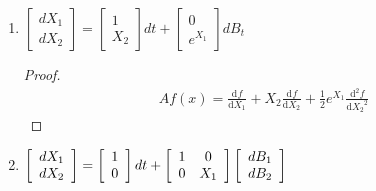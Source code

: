 \documentclass[11pt]{article}
\newcommand{\gs}{\sigma}
\newcommand{\mrm}{\mathrm}
\newcommand{\diff}{\mrm{d}}
\newcommand{\deriv}[3][]{%
  \ensuremath{\frac{\diff^{#1} {#2}}{\diff {#3}^{#1}}}}
\begin{document}
\begin{enumerate}
\begin{proof}
\begin{align*}
\begin{bmatrix}
\end{bmatrix}=
\begin{bmatrix}
1 \\ \mu X_t
\end{bmatrix} dt +
\begin{bmatrix}
0 \\ \gs
\end{bmatrix} dB_t
\end{align*} so letting $x_2=x$ and $x_1=t$:
\begin{align*}
Af(x) &= \deriv{f}{x_1} + \mu x \deriv{f}{x_2} + \frac{1}{2} \gs^2 \deriv[2]{f}{x_2}\\
&= \deriv{f}{t} + \mu x \deriv{f}{x} + \frac{1}{2}\gs^2 \deriv[2]{f}{x}
\end{align*}
\end{proof}
\item $\left[ \begin{array} { c } { d X _ { 1 } } \\ { d X _ { 2 } } \end{array} \right] = \left[ \begin{array} { c } { 1 } \\ { X _ { 2 } } \end{array} \right] d t + \left[ \begin{array} { c } { 0 } \\ { e ^ { X _ { 1 } } } \end{array} \right] d B _ { t }$
\begin{proof}
\begin{align*}
Af(x) = \deriv{f}{X_1}+X_2 \deriv{f}{X_2} + \frac{1}{2}e^{X_1} \deriv[2]{f}{X_2}
\end{align*}
\end{proof}
\item $\left[ \begin{array} { l } { d X _ { 1 } } \\ { d X _ { 2 } } \end{array} \right] = \left[ \begin{array} { l } { 1 } \\ { 0 } \end{array} \right] d t + \left[ \begin{array} { c c } { 1 } & { 0 } \\ { 0 } & { X _ { 1 } } \end{array} \right] \left[ \begin{array} { l } { d B _ { 1 } } \\ { d B _ { 2 } } \end{array} \right]$

\end{enumerate}
\end{document}
